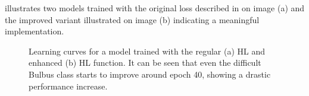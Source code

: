  illustrates two models trained with the original loss described in \cite{8767031} on image (a) and the improved variant illustrated on image (b) indicating a meaningful implementation.
\begin{figure}[H]%
  \centering
  \caption[Hausdorff loss training curves]{Learning curves for a model trained with the regular (a) \ac{HL} and enhanced (b) \ac{HL} function. It can be seen that even the difficult Bulbus class starts to improve around epoch 40, showing a drastic performance increase.}
  \label{hausdorff_loss_training_curves}
\end{figure}

